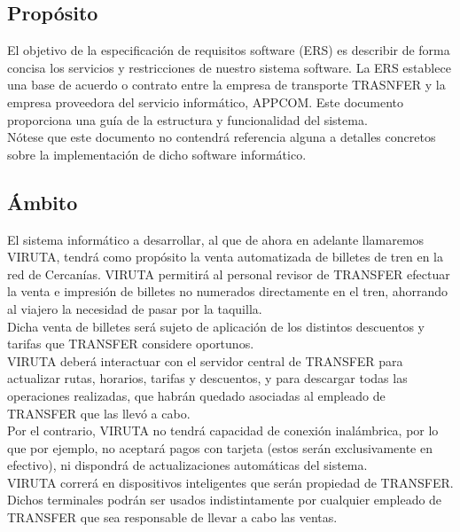 \subsection{Propósito}

El objetivo de la especificación de requisitos software (ERS) es describir de forma concisa los servicios y restricciones de nuestro sistema software. La ERS establece una base de acuerdo o contrato entre la empresa de transporte TRASNFER y la empresa proveedora del servicio informático, APPCOM. Este documento proporciona una guía de la estructura y funcionalidad del sistema.\\

Nótese que este documento no contendrá referencia alguna a detalles concretos sobre la implementación de dicho software informático.

\subsection{Ámbito}

El sistema informático a desarrollar, al que de ahora en adelante llamaremos VIRUTA, tendrá como propósito la venta automatizada de billetes de tren en la red de Cercanías. VIRUTA permitirá al personal revisor de TRANSFER efectuar la venta e impresión de billetes no numerados directamente en el tren, ahorrando al viajero la necesidad de pasar por la taquilla.\\

Dicha venta de billetes será sujeto de aplicación de los distintos descuentos y tarifas que TRANSFER considere oportunos.\\

VIRUTA deberá interactuar con el servidor central de TRANSFER para actualizar rutas, horarios, tarifas y descuentos, y para descargar todas las operaciones realizadas, que habrán quedado asociadas al empleado de TRANSFER que las llevó a cabo.\\

Por el contrario, VIRUTA no tendrá capacidad de conexión inalámbrica, por lo que por ejemplo, no aceptará pagos con tarjeta (estos serán exclusivamente en efectivo), ni dispondrá de actualizaciones automáticas del sistema.\\

VIRUTA correrá en dispositivos inteligentes que serán propiedad de TRANSFER. Dichos terminales podrán ser usados indistintamente por cualquier empleado de TRANSFER que sea responsable de llevar a cabo las ventas.\\

